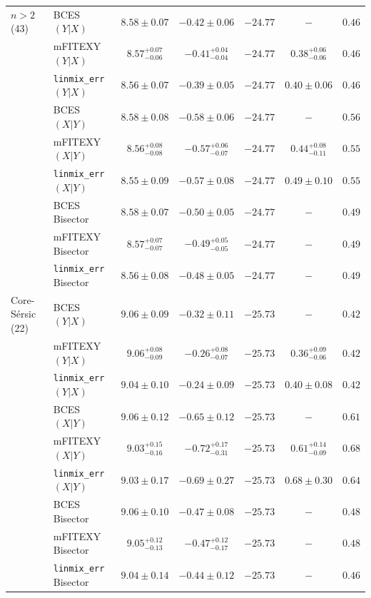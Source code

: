 \documentclass[preprint2]{emulateapj}
\begin{document}
\begin{table}
\begin{tabular}{llccccc}
$n>2$ (43)             & BCES $(Y|X)$      & $8.58 \pm 0.07$ & $-0.42 \pm 0.06$ & $-24.77$ & $-$ & $0.46$ \\
                       & mFITEXY $(Y|X)$    & $8.57^{+0.07}_{-0.06}$ & $-0.41^{+0.04}_{-0.04}$ & $-24.77$ & $0.38^{+0.06}_{-0.06}$ & $0.46$ \\
                       & {\tt linmix\_err} $(Y|X)$     & $8.56 \pm 0.07$ & $-0.39 \pm 0.05$ & $-24.77$ & $0.40 \pm 0.06$ & $0.46$ \\ [0.5em]
                       & BCES $(X|Y)$      & $8.58 \pm 0.08$ & $-0.58 \pm 0.06$ & $-24.77$ & $-$ & $0.56$ \\
                       & mFITEXY $(X|Y)$    & $8.56^{+0.08}_{-0.08}$ & $-0.57^{+0.06}_{-0.07}$ & $-24.77$ & $0.44^{+0.08}_{-0.11}$ & $0.55$ \\
                       & {\tt linmix\_err} $(X|Y)$     & $8.55 \pm 0.09$ & $-0.57 \pm 0.08$ & $-24.77$ & $0.49 \pm 0.10$ & $0.55$ \\ [0.5em]
                       & BCES Bisector     & $8.58 \pm 0.07$ & $-0.50 \pm 0.05$ & $-24.77$ & $-$ & $0.49$ \\
                       & mFITEXY Bisector   & $8.57^{+0.07}_{-0.07}$ & $-0.49^{+0.05}_{-0.05}$ & $-24.77$ & $-$    & $0.49$ \\
                       & {\tt linmix\_err} Bisector    & $8.56 \pm 0.08$ & $-0.48 \pm 0.05$ & $-24.77$ & $-$    & $0.49$ \\  [0.5em]
                   
Core-S\'ersic (22) & BCES $(Y|X)$   & $9.06 \pm 0.09$ & $-0.32 \pm 0.11$  & $-25.73$ & $-$    & $0.42$ \\
                   & mFITEXY $(Y|X)$   & $9.06^{+0.08}_{-0.09}$ & $-0.26^{+0.08}_{-0.07}$ & $-25.73$ & $0.36^{+0.09}_{-0.06}$ & $0.42$ \\
                   & {\tt linmix\_err} $(Y|X)$  & $9.04 \pm 0.10$ & $-0.24 \pm 0.09$ & $-25.73$ & $0.40 \pm 0.08$ & $0.42$ \\ [0.5em]
                   & BCES $(X|Y)$   & $9.06 \pm 0.12$ & $-0.65 \pm 0.12$  & $-25.73$ & $-$    & $0.61$ \\
                   & mFITEXY $(X|Y)$   & $9.03^{+0.15}_{-0.16}$ & $-0.72^{+0.17}_{-0.31}$ & $-25.73$ & $0.61^{+0.14}_{-0.09}$ & $0.68$ \\
                   & {\tt linmix\_err} $(X|Y)$  & $9.03 \pm 0.17$ & $-0.69 \pm 0.27$ & $-25.73$ & $0.68 \pm 0.30$ & $0.64$ \\ [0.5em]
                   & BCES Bisector  & $9.06 \pm 0.10$ & $-0.47 \pm 0.08$  & $-25.73$ & $-$    & $0.48$ \\
                   & mFITEXY Bisector  & $9.05^{+0.12}_{-0.13}$ & $-0.47^{+0.12}_{-0.17}$ & $-25.73$ & $-$    & $0.48$ \\
                   & {\tt linmix\_err} Bisector & $9.04 \pm 0.14$ & $-0.44 \pm 0.12$ & $-25.73$ & $-$    & $0.46$ \\ [0.5em]


\end{tabular}
\end{table}
\end{document}
